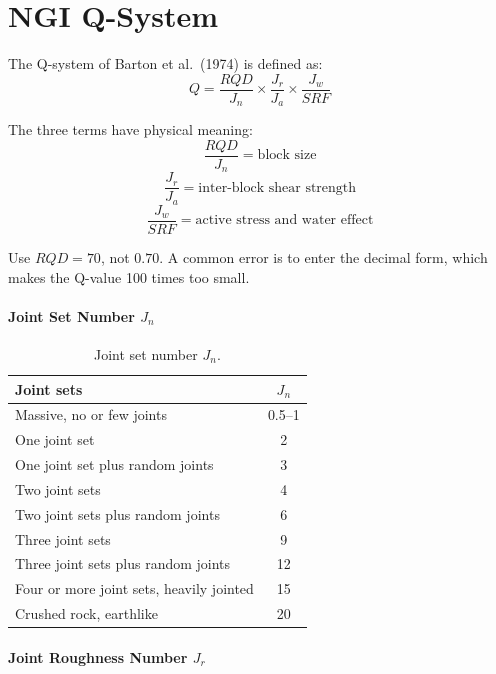 \section{NGI Q-System}

The Q-system of Barton et al.\ (1974) is defined as:
\[
Q =
\frac{RQD}{J_n}
\times
\frac{J_r}{J_a}
\times
\frac{J_w}{SRF}
\]

The three terms have physical meaning:
\[
\frac{RQD}{J_n} = \text{block size}
\]
\[
\frac{J_r}{J_a} = \text{inter-block shear strength}
\]
\[
\frac{J_w}{SRF} = \text{active stress and water effect}
\]

\begin{notebox}
Use \(RQD=70\), not \(0.70\). A common error is to enter the decimal form, which
makes the Q-value 100 times too small.
\end{notebox}

\paragraph{Joint Set Number \(J_n\)}

\begin{table}[H]
\centering
\small
\begin{tabularx}{0.85\textwidth}{Y c}
\toprule
\textbf{Joint sets} & \textbf{\(J_n\)} \\
\midrule
Massive, no or few joints & 0.5--1 \\
One joint set & 2 \\
One joint set plus random joints & 3 \\
Two joint sets & 4 \\
Two joint sets plus random joints & 6 \\
Three joint sets & 9 \\
Three joint sets plus random joints & 12 \\
Four or more joint sets, heavily jointed & 15 \\
Crushed rock, earthlike & 20 \\
\bottomrule
\end{tabularx}
\caption{Joint set number \(J_n\).}
\label{tab:jn}
\end{table}

\paragraph{Joint Roughness Number \(J_r\)}

